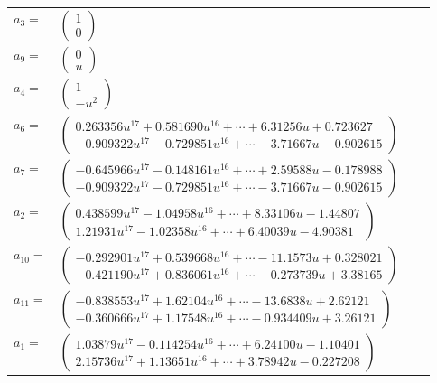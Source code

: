 \documentclass[1p]{elsarticle_modified}
\theoremstyle{definition}
\begin{document}
\begin{tabular}{m{7pt} m{180pt} m{7pt} m{180pt} }
\flushright $a_{3}=$&$\begin{pmatrix}1\\0\end{pmatrix}$ \\
\flushright $a_{9}=$&$\begin{pmatrix}0\\u\end{pmatrix}$ \\
\flushright $a_{4}=$&$\begin{pmatrix}1\\- u^2\end{pmatrix}$ \\
\flushright $a_{6}=$&$\begin{pmatrix}0.263356 u^{17}+0.581690 u^{16}+\cdots+6.31256 u+0.723627\\-0.909322 u^{17}-0.729851 u^{16}+\cdots-3.71667 u-0.902615\end{pmatrix}$ \\
\flushright $a_{7}=$&$\begin{pmatrix}-0.645966 u^{17}-0.148161 u^{16}+\cdots+2.59588 u-0.178988\\-0.909322 u^{17}-0.729851 u^{16}+\cdots-3.71667 u-0.902615\end{pmatrix}$ \\
\flushright $a_{2}=$&$\begin{pmatrix}0.438599 u^{17}-1.04958 u^{16}+\cdots+8.33106 u-1.44807\\1.21931 u^{17}-1.02358 u^{16}+\cdots+6.40039 u-4.90381\end{pmatrix}$ \\
\flushright $a_{10}=$&$\begin{pmatrix}-0.292901 u^{17}+0.539668 u^{16}+\cdots-11.1573 u+0.328021\\-0.421190 u^{17}+0.836061 u^{16}+\cdots-0.273739 u+3.38165\end{pmatrix}$ \\
\flushright $a_{11}=$&$\begin{pmatrix}-0.838553 u^{17}+1.62104 u^{16}+\cdots-13.6838 u+2.62121\\-0.360666 u^{17}+1.17548 u^{16}+\cdots-0.934409 u+3.26121\end{pmatrix}$ \\
\flushright $a_{1}=$&$\begin{pmatrix}1.03879 u^{17}-0.114254 u^{16}+\cdots+6.24100 u-1.10401\\2.15736 u^{17}+1.13651 u^{16}+\cdots+3.78942 u-0.227208\end{pmatrix}$ \\

\end{tabular}
\end{document}
